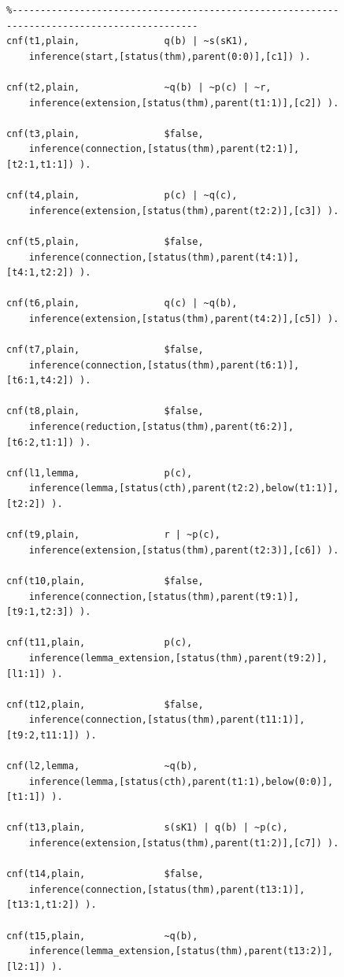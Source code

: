 \documentclass{ceurart}
\begin{document}
\begin{figure}[h!]
\centering
{\scriptsize
{\setlength{\baselineskip}{2.6mm}
\begin{verbatim}
%--------------------------------------------------------------------------------------------
cnf(t1,plain,               q(b) | ~s(sK1),
    inference(start,[status(thm),parent(0:0)],[c1]) ).

cnf(t2,plain,               ~q(b) | ~p(c) | ~r,
    inference(extension,[status(thm),parent(t1:1)],[c2]) ).

cnf(t3,plain,               $false,
    inference(connection,[status(thm),parent(t2:1)],[t2:1,t1:1]) ).

cnf(t4,plain,               p(c) | ~q(c),
    inference(extension,[status(thm),parent(t2:2)],[c3]) ).

cnf(t5,plain,               $false,
    inference(connection,[status(thm),parent(t4:1)],[t4:1,t2:2]) ).

cnf(t6,plain,               q(c) | ~q(b),
    inference(extension,[status(thm),parent(t4:2)],[c5]) ).

cnf(t7,plain,               $false,
    inference(connection,[status(thm),parent(t6:1)],[t6:1,t4:2]) ).

cnf(t8,plain,               $false,
    inference(reduction,[status(thm),parent(t6:2)],[t6:2,t1:1]) ).

cnf(l1,lemma,               p(c),
    inference(lemma,[status(cth),parent(t2:2),below(t1:1)],[t2:2]) ).

cnf(t9,plain,               r | ~p(c),
    inference(extension,[status(thm),parent(t2:3)],[c6]) ).

cnf(t10,plain,              $false,
    inference(connection,[status(thm),parent(t9:1)],[t9:1,t2:3]) ).

cnf(t11,plain,              p(c),
    inference(lemma_extension,[status(thm),parent(t9:2)],[l1:1]) ).

cnf(t12,plain,              $false,
    inference(connection,[status(thm),parent(t11:1)],[t9:2,t11:1]) ).

cnf(l2,lemma,               ~q(b),
    inference(lemma,[status(cth),parent(t1:1),below(0:0)],[t1:1]) ).

cnf(t13,plain,              s(sK1) | q(b) | ~p(c),
    inference(extension,[status(thm),parent(t1:2)],[c7]) ).

cnf(t14,plain,              $false,
    inference(connection,[status(thm),parent(t13:1)],[t13:1,t1:2]) ).

cnf(t15,plain,              ~q(b),
    inference(lemma_extension,[status(thm),parent(t13:2)],[l2:1]) ).


\end{verbatim}}}
\end{figure}
\end{document}
